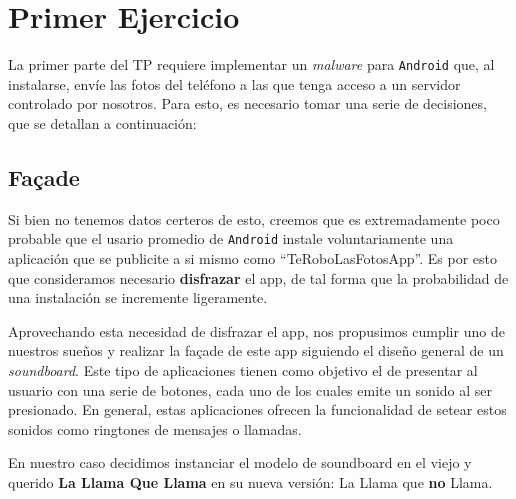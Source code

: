 \documentclass[10pt, a4paper,english,spanish]{article}
\renewcommand{\emph}[1]{\textit{#1}}
\begin{document}

\maketitle
\pagebreak

\tableofcontents
\pagebreak

\section{Primer Ejercicio} %

La primer parte del TP requiere implementar un \emph{malware} para \texttt{Android} que, al instalarse, envíe las fotos del teléfono a las que tenga acceso a un servidor controlado por nosotros. Para esto, es necesario tomar una serie de decisiones, que se detallan a continuación:

\subsection{Façade} %
\label{sub:fa_ade}
Si bien no tenemos datos certeros de esto, creemos que es extremadamente poco probable que el usario promedio de \texttt{Android} instale voluntariamente una aplicación que se publicite a si mismo como ``TeRoboLasFotosApp''. Es por esto que consideramos necesario \textbf{disfrazar} el app, de tal forma que la probabilidad de una instalación se incremente ligeramente. 

Aprovechando esta necesidad de disfrazar el app, nos propusimos cumplir uno de nuestros sueños y realizar la façade de este app siguiendo el diseño general de un \textit{soundboard}. Este tipo de aplicaciones tienen como objetivo el de presentar al usuario con una serie de botones, cada uno de los cuales emite un sonido al ser presionado. En general, estas aplicaciones ofrecen la funcionalidad de setear estos sonidos como ringtones de mensajes o llamadas.

En nuestro caso decidimos instanciar el modelo de soundboard en el viejo y querido \textbf{La Llama Que Llama} en su nueva versión: La Llama que \textbf{no} Llama.
\end{document}
